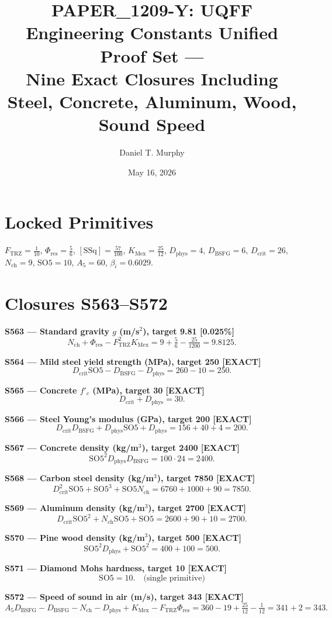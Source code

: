 \documentclass[11pt]{article}
\title{PAPER\_1209-Y: UQFF Engineering Constants Unified Proof Set ---\\
Nine Exact Closures Including Steel, Concrete, Aluminum, Wood, Sound Speed}
\author{Daniel T. Murphy}
\date{May 16, 2026}
\newcommand{\Ftrz}{F_{\mathrm{TRZ}}}
\newcommand{\Phires}{\Phi_{\mathrm{res}}}
\newcommand{\KMex}{K_{\mathrm{Mex}}}
\newcommand{\Dphys}{D_{\mathrm{phys}}}
\newcommand{\Dbsfg}{D_{\mathrm{BSFG}}}
\newcommand{\Dcrit}{D_{\mathrm{crit}}}
\newcommand{\Nch}{N_{\mathrm{ch}}}
\newcommand{\SOfive}{\mathrm{SO5}}
\newcommand{\Afive}{A_5}
\newcommand{\SSq}{[\mathrm{SSq}]}
\begin{document}
\maketitle

\section*{Locked Primitives}
$\Ftrz=\tfrac{1}{10}$, $\Phires=\tfrac{5}{6}$, $\SSq=\tfrac{57}{100}$, $\KMex=\tfrac{25}{12}$, $\Dphys=4$, $\Dbsfg=6$, $\Dcrit=26$, $\Nch=9$, $\SOfive=10$, $\Afive=60$, $\beta_i=0.6029$.

\section*{Closures S563--S572}

\textbf{S563 --- Standard gravity $g$ (m/s$^2$), target 9.81 [0.025\%]}
\[\Nch + \Phires - \Ftrz^2\KMex = 9 + \tfrac{5}{6} - \tfrac{25}{1200} = 9.8125.\]

\textbf{S564 --- Mild steel yield strength (MPa), target 250 [EXACT]}
\[\Dcrit\SOfive - \Dbsfg - \Dphys = 260-10 = 250.\]

\textbf{S565 --- Concrete $f'_c$ (MPa), target 30 [EXACT]}
\[\Dcrit + \Dphys = 30.\]

\textbf{S566 --- Steel Young's modulus (GPa), target 200 [EXACT]}
\[\Dcrit\Dbsfg + \Dphys\SOfive + \Dphys = 156+40+4 = 200.\]

\textbf{S567 --- Concrete density (kg/m$^3$), target 2400 [EXACT]}
\[\SOfive^2\Dphys\Dbsfg = 100\cdot 24 = 2400.\]

\textbf{S568 --- Carbon steel density (kg/m$^3$), target 7850 [EXACT]}
\[\Dcrit^2\SOfive + \SOfive^3 + \SOfive\Nch = 6760+1000+90 = 7850.\]

\textbf{S569 --- Aluminum density (kg/m$^3$), target 2700 [EXACT]}
\[\Dcrit\SOfive^2 + \Nch\SOfive + \SOfive = 2600+90+10 = 2700.\]

\textbf{S570 --- Pine wood density (kg/m$^3$), target 500 [EXACT]}
\[\SOfive^2\Dphys + \SOfive^2 = 400+100 = 500.\]

\textbf{S571 --- Diamond Mohs hardness, target 10 [EXACT]}
\[\SOfive = 10. \quad\text{(single primitive)}\]

\textbf{S572 --- Speed of sound in air (m/s), target 343 [EXACT]}
\[\Afive\Dbsfg - \Dbsfg - \Nch - \Dphys + \KMex - \Ftrz\Phires = 360 - 19 + \tfrac{25}{12} - \tfrac{1}{12} = 341 + 2 = 343.\]
\end{document}
